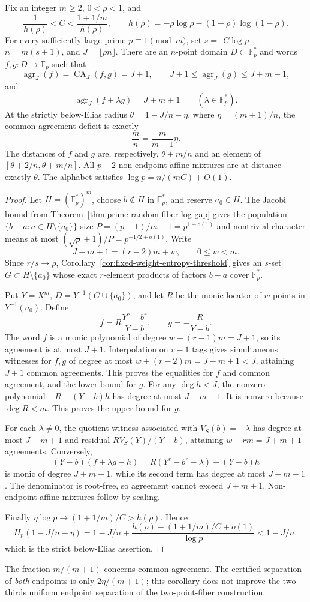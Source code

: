 \begin{corollary}
\label{cor:fixed-fiber-common-gap}
Fix an integer $m\ge2$, $0<\rho<1$, and
\[
 \frac1{h(\rho)}<C<\frac{1+1/m}{h(\rho)},\qquad
 h(\rho)=-\rho\log\rho-(1-\rho)\log(1-\rho).
\]
For every sufficiently large prime $p\equiv1\pmod m$, set
$s=\lceil C\log p\rceil$, $n=m(s+1)$, and $J=\lfloor\rho n\rfloor$.
There are an $n$-point domain $D\subset\mathbb F_p^*$ and words
$f,g:D\to\mathbb F_p$ such that
\[
 \operatorname{agr}_J(f)=\operatorname{CA}_J(f,g)=J+1,
 \qquad J+1\le\operatorname{agr}_J(g)\le J+m-1,
\]
and
\[
 \operatorname{agr}_J(f+\lambda g)=J+m+1
 \qquad(\lambda\in\mathbb F_p^*).
\]
At the strictly below-Elias radius
$\theta=1-J/n-\eta$, where $\eta=(m+1)/n$, the common-agreement
deficit is exactly
\[
 \frac mn=\frac{m}{m+1}\eta.
\]
The distances of $f$ and $g$ are, respectively, $\theta+m/n$ and
an element of $[\theta+2/n,\theta+m/n]$.  All $p-2$ non-endpoint
affine mixtures are at distance exactly $\theta$.
The alphabet satisfies $\log p=n/(mC)+O(1)$.
\end{corollary}
\begin{proof}
Let $H=(\mathbb F_p^*)^m$, choose $b\notin H$ in $\mathbb F_p^*$,
and reserve $a_0\in H$.  The Jacobi bound from
Theorem~\ref{thm:prime-random-fiber-log-gap} gives the population
$\{b-a:a\in H\setminus\{a_0\}\}$ size
$P=(p-1)/m-1=p^{1+o(1)}$ and nontrivial character means at most
$(\sqrt p+1)/P=p^{-1/2+o(1)}$.
Write
\[
 J-m+1=(r-2)m+w,\qquad 0\le w<m.
\]
Since $r/s\to\rho$, Corollary~\ref{cor:fixed-weight-entropy-threshold}
gives an $s$-set $G\subset H\setminus\{a_0\}$ whose exact
$r$-element products of factors $b-a$ cover $\mathbb F_p^*$.

Put $Y=X^m$, $D=Y^{-1}(G\cup\{a_0\})$, and let $R$ be the
monic locator of $w$ points in $Y^{-1}(a_0)$.  Define
\[
 f=R\frac{Y^r-b^r}{Y-b},\qquad g=-\frac R{Y-b}.
\]
The word $f$ is a monic polynomial of degree
$w+(r-1)m=J+1$, so its agreement is at most $J+1$.
Interpolation on $r-1$ tags gives simultaneous witnesses for $f,g$
of degree at most $w+(r-2)m=J-m+1<J$, attaining $J+1$ common
agreements.  This proves the equalities for $f$ and common agreement,
and the lower bound for $g$.  For any $\deg h<J$, the nonzero polynomial
$-R-(Y-b)h$ has degree at most $J+m-1$.  It is nonzero because
$\deg R<m$.  This proves the upper bound for $g$.

For each $\lambda\ne0$, the quotient witness associated with
$V_S(b)=-\lambda$ has degree at most $J-m+1$ and residual
$RV_S(Y)/(Y-b)$, attaining $w+rm=J+m+1$ agreements.
Conversely,
\[
 (Y-b)(f+\lambda g-h)
 =R(Y^r-b^r-\lambda)-(Y-b)h
\]
is monic of degree $J+m+1$, while its second term has degree at
most $J+m-1$.  The denominator is root-free, so agreement cannot
exceed $J+m+1$.  Non-endpoint affine mixtures follow by scaling.

Finally $\eta\log p\to(1+1/m)/C>h(\rho)$.  Hence
\[
 H_p(1-J/n-\eta)
 =1-J/n+
 \frac{h(\rho)-(1+1/m)/C+o(1)}{\log p}<1-J/n,
\]
which is the strict below-Elias assertion.
\end{proof}

The fraction $m/(m+1)$ concerns common agreement.  The certified
separation of \emph{both} endpoints is only $2\eta/(m+1)$; this
corollary does not improve the two-thirds uniform endpoint separation
of the two-point-fiber construction.
